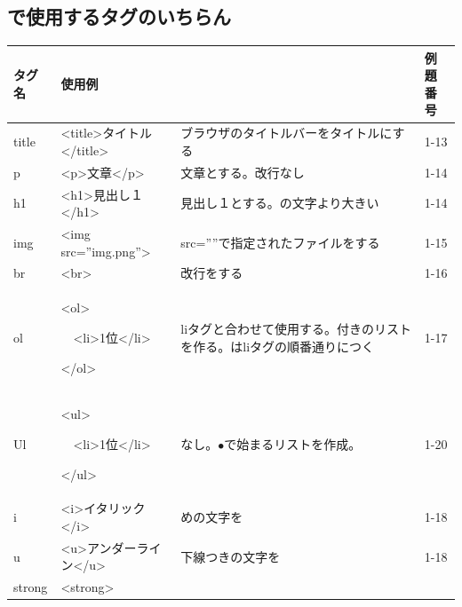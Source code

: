 \documentclass[a4paper,12pt]{jarticle}
\begin{document}
\clearpage\subsection{で使用するタグのいちらん}
{\small
  \begin{center}
    \tablefirsthead{}
    \tablehead{}
    \tabletail{}
    \tablelasttail{}
    \begin{supertabular}{|m{2.171cm}|m{4.1060004cm}|m{7.8930006cm}|m{2.037cm}|}
      \hline
      タグ名 &
      使用例 &
       &
      例題番号\\\hline
      title &
      {\textless}title{\textgreater}タイトル{\textless}/title{\textgreater} &
      ブラウザのタイトルバーをタイトルにする
      &
      1-13\\\hline
      p &
      {\textless}p{\textgreater}文章{\textless}/p{\textgreater} &
      文章とする。改行なし &
      1-14\\\hline
      h1 &
      {\textless}h1{\textgreater}見出し１{\textless}/h1{\textgreater} &
      見出し１とする。の文字より大きい
      &
      1-14\\\hline
      img &
      {\textless}img src=”img.png”{\textgreater} &
      src=””で指定されたファイルをする
      &
      1-15\\\hline
      br &
      {\textless}br{\textgreater} &
      改行をする &
      1-16\\\hline
      ol &
      {\textless}ol{\textgreater}

      \ \ {\textless}li{\textgreater}1位{\textless}/li{\textgreater}

      {\textless}/ol{\textgreater} &
      liタグと合わせて使用する。付きのリストを作る。はliタグの順番通りにつく
      &
      1-17\\\hline
      Ul &
      {\textless}ul{\textgreater}

      \ \ {\textless}li{\textgreater}1位{\textless}/li{\textgreater}

      {\textless}/ul{\textgreater} &
      なし。${\bullet}で始まるリストを作成。$
      &
      1-20\\\hline
      i &
      {\textless}i{\textgreater}イタリック{\textless}/i{\textgreater} &
      めの文字を &
      1-18\\\hline
      u &
      {\textless}u{\textgreater}アンダーライン{\textless}/u{\textgreater} &
      下線つきの文字を &
      1-18\\\hline
      strong &
      {\textless}strong{\textgreater}


\end{supertabular}
\end{center}}
\end{document}
